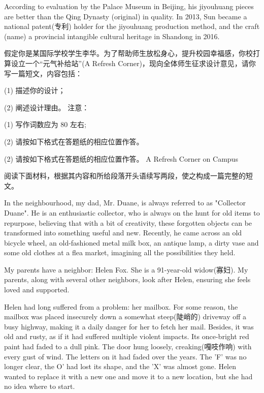 \documentclass{英语试卷}
\begin{document}
\par According to evaluation by the Palace Museum in Beijing, his jiyouhuang pieces are better than the Qing Dynasty  (original) in quality. In 2013, Sun became a national patent(专利) holder for the jiyouhuang production method, and the craft  (name) a provincial intangible cultural heritage in Shandong in 2016.\par
{}
\par 假定你是某国际学校学生李华。为了帮助师生放松身心，提升校园幸福感，你校打算设立一个“元气补给站”(A Refresh Corner)，现向全体师生征求设计意见，请你写一篇短文，内容包括：\par
\par (1) 描述你的设计；\par
\par (2) 阐述设计理由。 注意：\par
\par (1) 写作词数应为 80 左右;\par
\par (2) 请按如下格式在答题纸的相应位置作答。\par
\par (2) 请按如下格式在答题纸的相应位置作答。 A Refresh Corner on Campus\par
{}
\par 阅读下面材料，根据其内容和所给段落开头语续写两段，使之构成一篇完整的短文。\par
\par In the neighbourhood, my dad, Mr. Duane, is always referred to as "Collector Duane". He is an enthusiastic collector, who is always on the hunt for old items to repurpose, believing that with a bit of creativity, these forgotten objects can be transformed into something useful and new. Recently, he came across an old bicycle wheel, an old-fashioned metal milk box, an antique lamp, a dirty vase and some old clothes at a flea market, imagining all the possibilities they held.\par
\par My parents have a neighbor: Helen Fox. She is a 91-year-old widow(寡妇). My parents, along with several other neighbors, look after Helen, ensuring she feels loved and supported.\par
\par Helen had long suffered from a problem: her mailbox. For some reason, the mailbox was placed insecurely down a somewhat steep(陡峭的) driveway off a busy highway, making it a daily danger for her to fetch her mail. Besides, it was old and rusty, as if it had suffered multiple violent impacts. Its once-bright red paint had faded to a dull pink. The door hung loosely, creaking(嘎吱作响) with every gust of wind. The letters on it had faded over the years. The 'F' was no longer clear, the O' had lost its shape, and the 'X' was almost gone. Helen wanted to replace it with a new one and move it to a new location, but she had no idea where to start.\par
\end{document}
